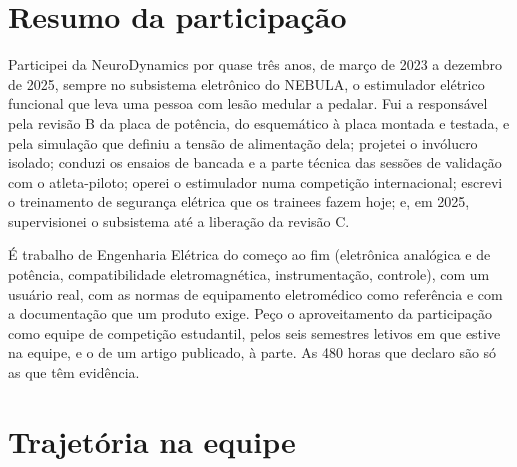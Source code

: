 \documentclass[final,exemplo]{nro-aacc}
\begin{document}
\capa
\requerimento
\quadrospedido
\sumario

\parteinstitucional


\identificacao

\section{Resumo da participação}
Participei da NeuroDynamics por quase três anos, de março de 2023 a dezembro de 2025, sempre no
subsistema eletrônico do NEBULA, o estimulador elétrico funcional que leva uma pessoa com lesão medular
a pedalar. Fui a responsável pela revisão B da placa de potência, do esquemático à placa montada e
testada, e pela simulação que definiu a tensão de alimentação dela; projetei o invólucro isolado;
conduzi os ensaios de bancada e a parte técnica das sessões de validação com o atleta-piloto; operei o
estimulador numa competição internacional; escrevi o treinamento de segurança elétrica que os trainees
fazem hoje; e, em 2025, supervisionei o subsistema até a liberação da revisão C.

É trabalho de Engenharia Elétrica do começo ao fim (eletrônica analógica e de potência,
compatibilidade eletromagnética, instrumentação, controle), com um usuário real, com as normas de
equipamento eletromédico como referência e com a documentação que um produto exige. Peço o
aproveitamento da participação como equipe de competição estudantil, pelos seis semestres letivos em
que estive na equipe, e o de um artigo publicado, à parte. As 480 horas que declaro são só as que têm
evidência.

\section{Trajetória na equipe}
\begin{trajetoria}
\end{trajetoria}
\end{document}
